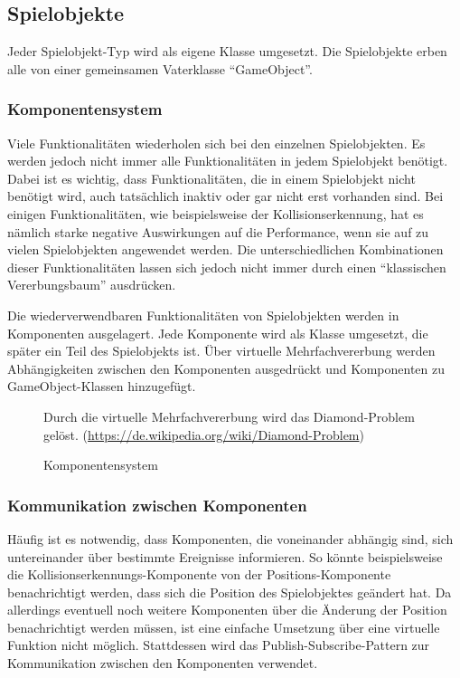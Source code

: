 	\subsection{Spielobjekte}
	
	Jeder Spielobjekt-Typ wird als eigene Klasse umgesetzt. Die Spielobjekte erben alle von einer gemeinsamen Vaterklasse \enquote{GameObject}.

		\subsubsection{Komponentensystem}

		Viele Funktionalitäten wiederholen sich bei den einzelnen Spielobjekten. Es werden jedoch nicht immer alle Funktionalitäten in jedem Spielobjekt benötigt. Dabei ist es wichtig, dass Funktionalitäten, die in einem Spielobjekt nicht benötigt wird, auch tatsächlich inaktiv oder gar nicht erst vorhanden sind. Bei einigen Funktionalitäten, wie beispielsweise der Kollisionserkennung, hat es nämlich starke negative Auswirkungen auf die Performance, wenn sie auf zu vielen Spielobjekten angewendet werden. Die unterschiedlichen Kombinationen dieser Funktionalitäten lassen sich jedoch nicht immer durch einen \enquote{klassischen Vererbungsbaum} ausdrücken.

		Die wiederverwendbaren Funktionalitäten von Spielobjekten werden in Komponenten ausgelagert. Jede Komponente wird als Klasse umgesetzt, die später ein Teil des Spielobjekts ist. Über virtuelle Mehrfachvererbung werden Abhängigkeiten zwischen den Komponenten ausgedrückt und Komponenten zu GameObject-Klassen hinzugefügt.
	
		\begin{figure}[h]
			\centering
			
			\caption{Komponentensystem}
			\medskip
			\small
			Durch die virtuelle Mehrfachvererbung wird das Diamond-Problem gelöst. (\url{https://de.wikipedia.org/wiki/Diamond-Problem})
		\end{figure}

		\subsubsection{Kommunikation zwischen Komponenten}

		Häufig ist es notwendig, dass Komponenten, die voneinander abhängig sind, sich untereinander über bestimmte Ereignisse informieren. So könnte beispielsweise die Kollisionserkennungs-Komponente von der Positions-Komponente benachrichtigt werden, dass sich die Position des Spielobjektes geändert hat. Da allerdings eventuell noch weitere Komponenten über die Änderung der Position benachrichtigt werden müssen, ist eine einfache Umsetzung über eine virtuelle Funktion nicht möglich. Stattdessen wird das Publish-Subscribe-Pattern zur Kommunikation zwischen den Komponenten verwendet.
		
